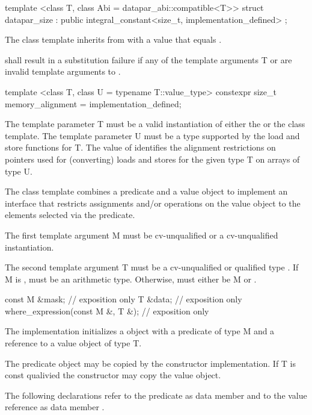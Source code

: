 \begin{itemdecl}
template <class T, class Abi = datapar_abi::compatible<T>>
struct datapar_size : public integral_constant<size_t, implementation_defined> {};
\end{itemdecl}
\begin{itemdescr}
  \pnum The  class template inherits from  with a value that equals \datapar{}.

  \pnum {} shall result in a substitution failure if any of the template arguments \type T or  are invalid template arguments to \datapar.
\end{itemdescr}

\begin{itemdecl}
template <class T, class U = typename T::value_type>
constexpr size_t memory_alignment = implementation_defined;
\end{itemdecl}
\begin{itemdescr}
  \pnum\requires The template parameter \type T must be a valid instantiation of either the \datapar or the \mask class template.
  \pnum\requires The template parameter \type U must be a type supported by the load and store functions for \type T.
  \pnum The value of  identifies the alignment restrictions on pointers used for (converting) loads and stores for the given type \type T on arrays of type \type U.
\end{itemdescr}

\pnum The class template  combines a predicate and a value object to implement an interface that restricts assignments and/or operations on the value object to the elements selected via the predicate.

\pnum The first template argument \type M must be cv-unqualified \bool or a cv-unqualified \mask instantiation.

\pnum The second template argument \type T must be a cv-unqualified or \const qualified type .
If \type M is \bool,  must be an arithmetic type.
Otherwise,  must either be \type M or .

\begin{itemdecl}
const M &mask;                     // exposition only
T &data;                           // exposition only
where_expression(const M &, T &);  // exposition only
\end{itemdecl}
\begin{itemdescr}
  \pnum\effects
  The implementation initializes a  object with a predicate of type \type M and a reference to a value object of type \type T.

  \pnum\realnote The predicate object may be copied by the constructor implementation.
  If \type T is const qualivied the constructor may copy the value object.

  \pnum\realnote
  The following declarations refer to the predicate as data member  and to the value reference as data member .
\end{itemdescr}

